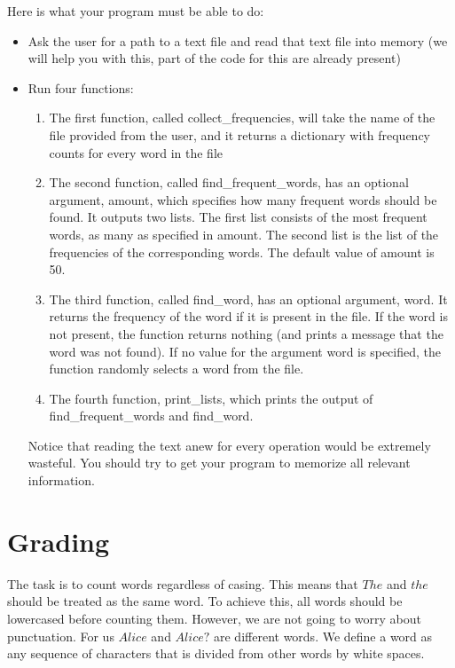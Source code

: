 \documentclass[11pt, a4paper]{article}
\begin{document}
Here is what your program must be able to do:
\begin{itemize}
    \item Ask the user for a path to a text file and read that text file into memory (we will help you with this, part of the code for this are already present)
\item Run four functions:
\begin{enumerate}
\item The first function, called collect\_frequencies, will take the name of the file provided from the user, and it returns a dictionary with frequency counts for every word in the file
\item The second function, called find\_frequent\_words, has an optional argument, amount, which specifies how many frequent words should be found. It outputs two lists. The first list consists of the most frequent words, as many as specified in amount. The second list is the list of the frequencies of the corresponding words. The default value of amount is 50.
\item The third function, called find\_word, has an optional argument, word. It returns the frequency of the word if it is present in the file. If the word is not present, the function returns nothing (and prints a message that the word was not found). If no value for the argument word is specified, the function randomly selects a word from the file.
\item The fourth function, print\_lists, which prints the output of find\_frequent\_words and find\_word.
\end{enumerate}
Notice that reading the text anew for every operation would be extremely wasteful. You should try to get your program to memorize all
relevant information.
\end{itemize}

\section{Grading}
The task is to count words regardless of casing. This means that $ The $ and $ the $ should be treated as the same word. To achieve this, all words should be lowercased before counting them. However, we are not going to worry about punctuation. For us $ Alice $ and $ Alice? $ are different words. We define a word as any sequence
of characters that is divided from other words by white spaces.
\end{document}
